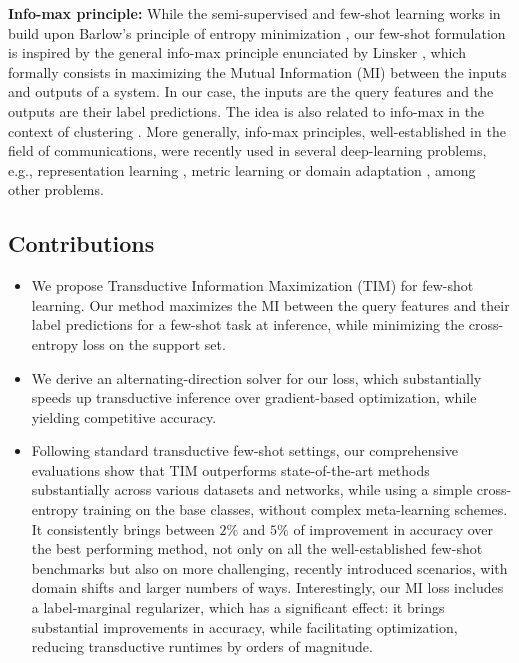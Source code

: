 \documentclass{article}
\begin{document}
        
        
        \textbf{Info-max principle:} While the semi-supervised and few-shot learning works in \cite{grandvalet2005semi,dhillon2019baseline} build upon Barlow's principle of entropy minimization \cite{Barlow1989Unsupervised}, our few-shot formulation is inspired by the general info-max principle enunciated by Linsker \cite{Linsker1988Self}, which formally consists in maximizing the Mutual Information (MI) between the inputs and outputs of a system. In our case, the inputs are the query features and the outputs are their label predictions. The idea is also related to info-max in the context of clustering \cite{clustering_infomax,HuICML17,jabi}. More generally, info-max principles, well-established in the field of communications, were recently used in several deep-learning problems, e.g., representation learning \cite{deep_infomax,cpc}, metric learning \cite{boudiaf2020metric} or domain adaptation \cite{liang2020we}, among other problems.   
        
        






    \subsection{Contributions}
        \begin{itemize}
            \item We propose Transductive Information Maximization (TIM) for few-shot learning. Our method maximizes the MI between the query features and their label predictions for a few-shot task at inference, while minimizing the cross-entropy loss on the support set.
            \item We derive an alternating-direction solver for our loss, which substantially speeds up transductive inference over gradient-based optimization, while yielding competitive accuracy.
            \item Following standard transductive few-shot settings, our comprehensive evaluations show that TIM outperforms state-of-the-art methods substantially across various datasets and networks,  while using a simple cross-entropy training on the base classes, without complex meta-learning schemes. It consistently brings between $2 \%$ and $5 \%$ of improvement in accuracy over the best performing method, not only on all the well-established few-shot benchmarks but also on more challenging, recently introduced scenarios, with domain shifts and larger numbers of ways. Interestingly, our MI loss includes a label-marginal regularizer, which has a significant effect: it brings substantial improvements in accuracy, while facilitating optimization, reducing transductive runtimes by orders of magnitude.

        \end{itemize}
\end{document}
